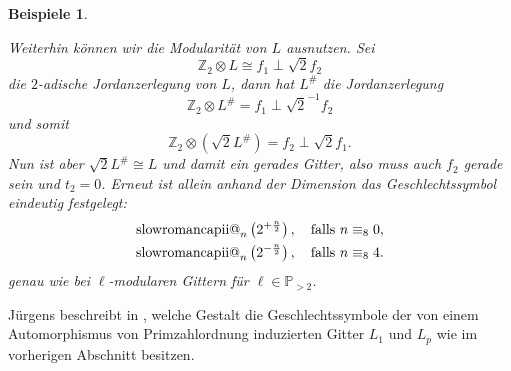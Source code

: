 \documentclass[12pt,a4paper,halfparskip,headsepline,bibtotocnumbered]{scrreprt}
\makeatletter
\theoremstyle{nummermitklammern}
\newtheorem{beispiele}[defsatzusw]{Beispiele}
\theoremstyle{nonumberbreak}
\newcommand{\Z}{\mathbb{Z}}
\renewcommand{\P}{\mathbb{P}}
\newcommand{\ii}{\text{\expandafter\@slowromancap\romannumeral 2@}}
\makeatother
\begin{document}
\begin{beispiele}
\begin{enumerate}[label=(\roman*)]
			Weiterhin können wir die Modularität von $L$ ausnutzen. Sei
			\begin{equation*}
				\Z_2 \otimes L \cong f_1 \perp \sqrt{2} f_2
			\end{equation*}
			die $2$-adische Jordanzerlegung von $L$, dann hat $L^\#$ die Jordanzerlegung
			\begin{equation*}
				\Z_2 \otimes L^\# = f_1 \perp \sqrt{2}^{-1} f_2
			\end{equation*}
			und somit
			\begin{equation*}
				\Z_2 \otimes (\sqrt{2} L^\#) = f_2 \perp \sqrt{2} f_1.
			\end{equation*}
			Nun ist aber $\sqrt{2} L^\# \cong L$ und damit ein gerades Gitter, also muss auch $f_2$ gerade sein und $t_2 = 0$. Erneut ist allein anhand der Dimension das Geschlechtssymbol eindeutig festgelegt:
			\begin{align*}
				\ii_n \left( 2^{+\frac{n}{2}} \right), \quad \text{falls } n \equiv_8 0,\\
				\ii_n \left( 2^{-\frac{n}{2}} \right), \quad \text{falls } n \equiv_8 4.\\
			\end{align*}
			genau wie bei $\ell$-modularen Gittern für $\ell \in \P_{>2}$.
	\end{enumerate}
\end{beispiele}

Jürgens beschreibt in \cite[Abschnitt (4.1.3)]{juergens}, welche Gestalt die Geschlechtssymbole der von einem Automorphismus von Primzahlordnung induzierten Gitter $L_1$ und $L_p$ wie im vorherigen Abschnitt besitzen.
\end{document}
